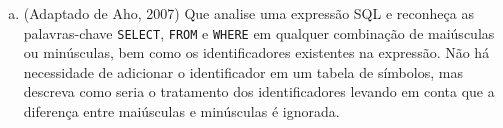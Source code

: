 \begin{enumerate}[a)]
Após a compilação do programa e supondo que o binário gerado
chama-se {\tt a.exe} (Windows) ou {\tt a.out} (Linux),
forneça um arquivo com código C como argumento
da seguinte forma no terminal (PowerShell, bash, ...):

\begin{verbatim}
# Windows
.\a.exe arquivo.c
# Linux
./a.out arquivo.c
\end{verbatim}

\item (Adaptado de Aho, 2007) Que analise uma expressão SQL e
  reconheça as palavras-chave {\tt SELECT}, {\tt FROM} e {\tt WHERE}
  em qualquer combinação de maiúsculas ou minúsculas, bem como os
  identificadores existentes na expressão.  Não há necessidade de
  adicionar o identificador em um tabela de símbolos, mas descreva
  como seria o tratamento dos identificadores levando em conta que a
  diferença entre maiúsculas e minúsculas é ignorada.
\end{enumerate}
